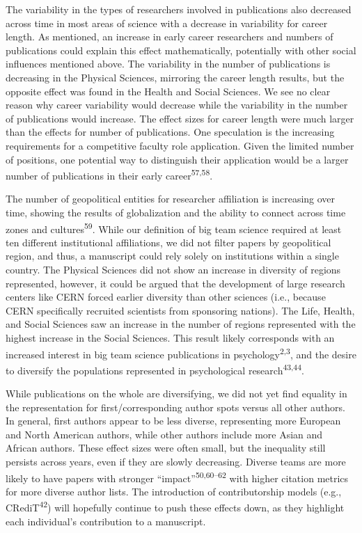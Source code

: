 \documentclass[
  man,floatsintext]{apa6}
\begin{document}
The variability in the types of researchers involved in publications
also decreased across time in most areas of science with a decrease in
variability for career length. As mentioned, an increase in early career
researchers and numbers of publications could explain this effect
mathematically, potentially with other social influences mentioned
above. The variability in the number of publications is decreasing in
the Physical Sciences, mirroring the career length results, but the
opposite effect was found in the Health and Social Sciences. We see no
clear reason why career variability would decrease while the variability
in the number of publications would increase. The effect sizes for
career length were much larger than the effects for number of
publications. One speculation is the increasing requirements for a
competitive faculty role application. Given the limited number of
positions, one potential way to distinguish their application would be a
larger number of publications in their early career\textsuperscript{57,58}.

The number of geopolitical entities for researcher affiliation is
increasing over time, showing the results of globalization and the
ability to connect across time zones and cultures\textsuperscript{59}. While our
definition of big team science required at least ten different
institutional affiliations, we did not filter papers by geopolitical
region, and thus, a manuscript could rely solely on institutions within
a single country. The Physical Sciences did not show an increase in
diversity of regions represented, however, it could be argued that the
development of large research centers like CERN forced earlier diversity
than other sciences (i.e., because CERN specifically recruited
scientists from sponsoring nations). The Life, Health, and Social
Sciences saw an increase in the number of regions represented with the
highest increase in the Social Sciences. This result likely corresponds
with an increased interest in big team science publications in
psychology\textsuperscript{2,3}, and the desire to diversify the
populations represented in psychological research\textsuperscript{43,44}.

While publications on the whole are diversifying, we did not yet find
equality in the representation for first/corresponding author spots
versus all other authors. In general, first authors appear to be less
diverse, representing more European and North American authors, while
other authors include more Asian and African authors. These effect sizes
were often small, but the inequality still persists across years, even
if they are slowly decreasing. Diverse teams are more likely to have
papers with stronger ``impact''\textsuperscript{50,60--62} with higher citation metrics for more diverse author lists.
The introduction of contributorship models (e.g., CRediT\textsuperscript{42})
will hopefully continue to push these effects down, as they highlight
each individual's contribution to a manuscript.
\end{document}
